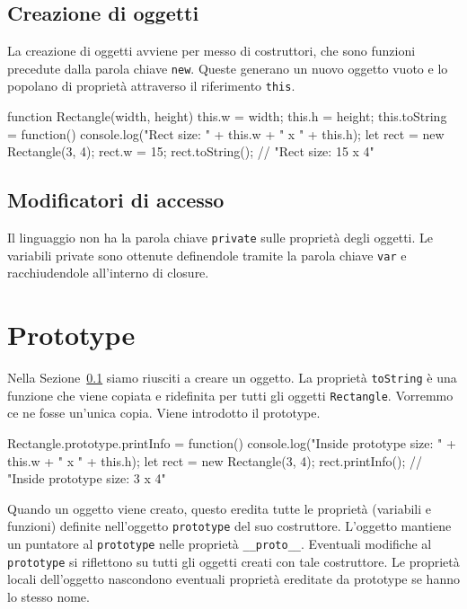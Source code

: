 \subsection{Creazione di oggetti}\label{sec:js:createobj}

La creazione di oggetti avviene per messo di costruttori, che sono funzioni precedute dalla parola chiave \texttt{new}. Queste generano un nuovo oggetto vuoto e lo popolano di proprietà attraverso il riferimento \texttt{this}.
\begin{javascriptcode}
function Rectangle(width, height) {
    this.w = width;
    this.h = height;
    this.toString = function() { 
        console.log("Rect size: " + this.w + " x " + this.h); 
    }
}
let rect = new Rectangle(3, 4);
rect.w = 15;
rect.toString(); // "Rect size: 15 x 4"
\end{javascriptcode}

\subsection{Modificatori di accesso}

Il linguaggio non ha la parola chiave \texttt{private} sulle proprietà degli oggetti. Le variabili private sono ottenute definendole tramite la parola chiave \texttt{var} e racchiudendole all'interno di closure.

\section{Prototype}

Nella Sezione~\ref{sec:js:createobj} siamo riusciti a creare un oggetto. La proprietà \texttt{toString} è una funzione che viene copiata e ridefinita per tutti gli oggetti \texttt{Rectangle}. Vorremmo ce ne fosse un'unica copia. Viene introdotto il prototype.
\begin{javascriptcode}
Rectangle.prototype.printInfo = function() { 
    console.log("Inside prototype size: " + this.w + " x " + this.h); 
}
let rect = new Rectangle(3, 4);
rect.printInfo(); // "Inside prototype size: 3 x 4"
\end{javascriptcode}
Quando un oggetto viene creato, questo eredita tutte le proprietà (variabili e funzioni) definite nell'oggetto \texttt{prototype} del suo costruttore. L'oggetto mantiene un puntatore al \texttt{prototype} nelle proprietà \texttt{__proto__}. Eventuali modifiche al \texttt{prototype} si riflettono su tutti gli oggetti creati con tale costruttore. Le proprietà locali dell'oggetto nascondono eventuali proprietà ereditate da prototype se hanno lo stesso nome. 






























